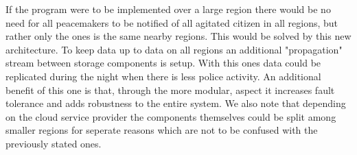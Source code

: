 \documentclass[11pt]{article}
\begin{document}
If the program were to be implemented over a large region there would be no
need for all peacemakers to be notified of all agitated citizen in all regions,
but rather only the ones is the same nearby regions. This would be solved by
this new architecture. To keep data up to data on all regions an additional
"propagation" stream between storage components is setup. With this ones data
could be replicated during the night when there is less police activity. An
additional benefit of this one is that, through the more modular, aspect it
increases fault tolerance and adds robustness to the entire system. We also note
that depending on the cloud service provider the components themselves could be
split among smaller regions for seperate reasons which are not to be confused
with the previously stated ones.
\end{document}
